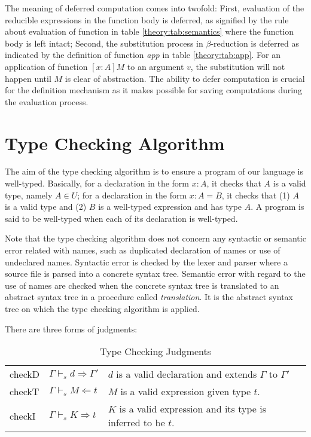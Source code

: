The meaning of deferred computation comes into twofold: First, evaluation of the reducible expressions in the function body is deferred, as signified by the rule about evaluation of function in table \ref{theory:tab:semantics} where the function body is left intact; Second, the substitution process in $\beta$-reduction is deferred as indicated by the definition of function \emph{app} in table \ref{theory:tab:app}. For an application of function $[x:A]M$ to an argument $v$, the substitution will not happen until $M$ is clear of abstraction. The ability to defer computation is crucial for the definition mechanism as it makes possible for saving computations during the evaluation process.

\section{Type Checking Algorithm}\label{theory:sec:check}
The aim of the type checking algorithm is to ensure a program of our language is well-typed. Basically, for a declaration in the form $x : A$, it checks that $A$ is a valid type, namely $A \in U$; for a declaration in the form $x : A = B$, it checks that (1) $A$ is a valid type and (2) $B$ is a well-typed expression and has type $A$. A program is said to be well-typed when each of its declaration is well-typed.

Note that the type checking algorithm does not concern any syntactic or semantic error related with names, such as duplicated declaration of names or use of undeclared names. Syntactic error is checked by the lexer and parser where a source file is parsed into a concrete syntax tree. Semantic error with regard to the use of names are checked when the concrete syntax tree is translated to an abstract syntax tree in a procedure called \emph{translation}. It is the abstract syntax tree on which the type checking algorithm is applied.

There are three forms of judgments:
\begin{table}[h]
  \centering
  \begin{tabular}{l l l}
    checkD & $\Gamma \vdash_s d \Rightarrow \Gamma'$ & $d$ is a valid declaration and extends $\Gamma$ to $\Gamma'$ \\
    checkT & $\Gamma \vdash_s M \Leftarrow t$ & $M$ is a valid expression given type $t$. \\
    checkI & $\Gamma \vdash_s K \Rightarrow t$ & $K$ is a valid expression and its type is inferred to be $t$.
  \end{tabular}
  \caption{Type Checking Judgments}
  \label{theory:tab:judgments}
\end{table}

